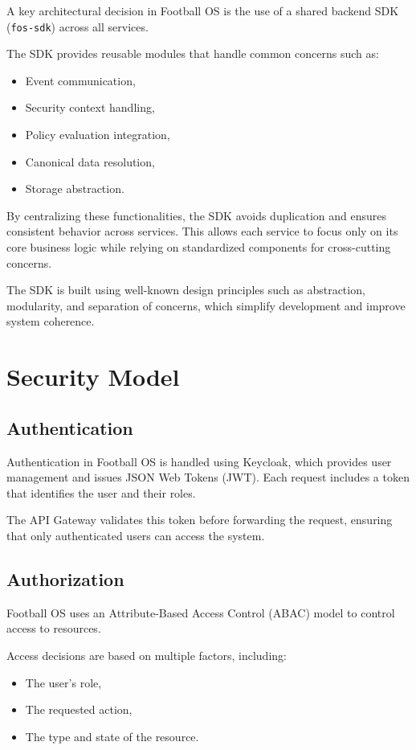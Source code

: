 A key architectural decision in Football OS is the use of a shared backend
SDK (\texttt{fos-sdk}) across all services.

The SDK provides reusable modules that handle common concerns such as:
\begin{itemize}
    \item Event communication,
    \item Security context handling,
    \item Policy evaluation integration,
    \item Canonical data resolution,
    \item Storage abstraction.
\end{itemize}

By centralizing these functionalities, the SDK avoids duplication and
ensures consistent behavior across services. This allows each service to
focus only on its core business logic while relying on standardized
components for cross-cutting concerns.

The SDK is built using well-known design principles such as abstraction,
modularity, and separation of concerns, which simplify development and
improve system coherence.

\section{Security Model}

\subsection{Authentication}

Authentication in Football OS is handled using Keycloak, which provides
user management and issues JSON Web Tokens (JWT). Each request includes
a token that identifies the user and their roles.

The API Gateway validates this token before forwarding the request,
ensuring that only authenticated users can access the system.

\subsection{Authorization}

Football OS uses an Attribute-Based Access Control (ABAC) model to
control access to resources.

Access decisions are based on multiple factors, including:
\begin{itemize}
    \item The user's role,
    \item The requested action,
    \item The type and state of the resource.
\end{itemize}

